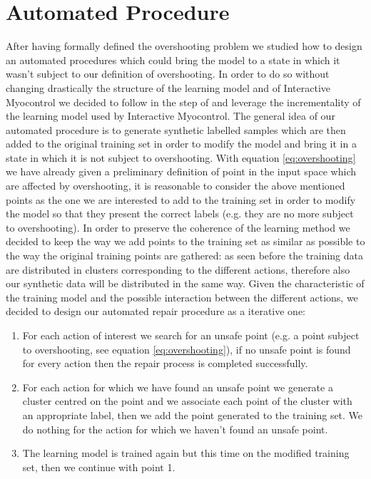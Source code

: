 \section{Automated Procedure}
After having formally defined the overshooting problem we studied how to design an automated procedures which could bring the model to a state in which it wasn't subject to our definition of overshooting. In order to do so without changing drastically the structure of the learning model and of Interactive Myocontrol we decided to follow in the step of \cite{Strazzulla2017} and leverage the incrementality of the learning model used by Interactive Myocontrol.
The general idea of our automated procedure is to generate synthetic labelled samples which are then added to the original training set in order to modify the model and bring it in a state in which it is not subject to overshooting. With equation \ref{eq:overshooting} we have already given a preliminary definition of point in the input space which are affected by overshooting, it is reasonable to consider the above mentioned points as the one we are interested to add to the training set in order to modify the model so that they present the correct labels (e.g. they are no more subject to overshooting).
In order to preserve the coherence of the learning method we decided to keep the way we add points to the training set as similar as possible to the way the original training points are gathered: as seen before the training data are distributed in clusters corresponding to the different actions, therefore also our synthetic data will be distributed in the same way.
Given the characteristic of the training model and the possible interaction between the different actions, we decided to design our automated repair procedure as a iterative one:
\begin{enumerate}
    \item For each action of interest we search for an unsafe point (e.g. a point subject to overshooting, see equation \ref{eq:overshooting}), if no unsafe point is found for every action then the repair process is completed successfully.
    \item For each action for which we have found an unsafe point we generate a cluster centred on the point and we associate each point of the cluster with an appropriate label, then we add the point generated to the training set. We do nothing for the action for which we haven't found an unsafe point.
    \item The learning model is trained again but this time on the modified training set, then we continue with point 1.
\end{enumerate}
